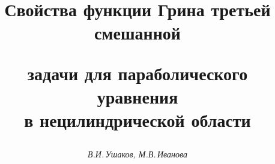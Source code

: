 









\newcommand{\la}{\langle}


\newcommand{\ra}{\rangle}


\newcommand{\tts}[1]{}







\setcounter{page}{68}















\author{\it В.И.\,Ушаков, М.В.\,Иванова}




\title{Свойства функции Грина третьей смешанной 


задачи для параболического уравнения\\ в нецилиндрической области}





\date{}




\pagestyle{plain} %







\maketitle


